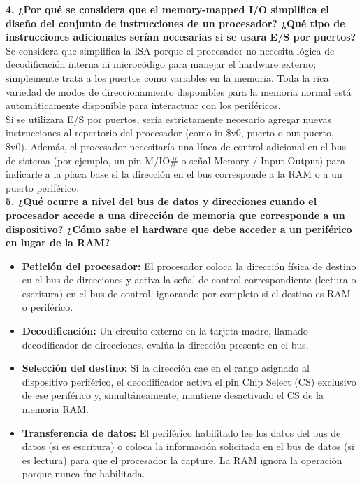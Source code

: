 \documentclass[]{article}
\begin{document}
	{\large \textbf{4. ¿Por qué se considera que el memory-mapped I/O simplifica el diseño del conjunto de instrucciones de un procesador? ¿Qué tipo de instrucciones adicionales serían necesarias si se usara E/S por puertos?}} \\
	
	Se considera que simplifica la ISA porque el procesador no necesita lógica de decodificación interna ni microcódigo para manejar el hardware externo; simplemente trata a los puertos como variables en la memoria. Toda la rica variedad de modos de direccionamiento disponibles para la memoria normal está automáticamente disponible para interactuar con los periféricos. \\
	
	Si se utilizara E/S por puertos, sería estrictamente necesario agregar nuevas instrucciones al repertorio del procesador (como in \$v0, puerto o out puerto, \$v0). Además, el procesador necesitaría una línea de control adicional en el bus de sistema (por ejemplo, un pin M/IO\# o señal Memory / Input-Output) para indicarle a la placa base si la dirección en el bus corresponde a la RAM o a un puerto periférico. \\
	
	{\large \textbf{5. ¿Qué ocurre a nivel del bus de datos y direcciones cuando el procesador accede a una dirección de memoria que corresponde a un dispositivo? ¿Cómo sabe el hardware que debe acceder a un periférico en lugar de la RAM?}} \\
	
	\begin{itemize}[label=$\bullet$]
		\item \textbf{Petición del procesador:} El procesador coloca la dirección física de destino en el bus de direcciones y activa la señal de control correspondiente (lectura o escritura) en el bus de control, ignorando por completo si el destino es RAM o periférico.
		
		\item \textbf{Decodificación:} Un circuito externo en la tarjeta madre, llamado decodificador de direcciones, evalúa la dirección presente en el bus.
		
		\item \textbf{Selección del destino:} Si la dirección cae en el rango asignado al dispositivo periférico, el decodificador activa el pin Chip Select (CS) exclusivo de ese periférico y, simultáneamente, mantiene desactivado el CS de la memoria RAM.
		
		\item \textbf{Transferencia de datos:} El periférico habilitado lee los datos del bus de datos (si es escritura) o coloca la información solicitada en el bus de datos (si es lectura) para que el procesador la capture. La RAM ignora la operación porque nunca fue habilitada.
	\end{itemize}
	
\end{document}
